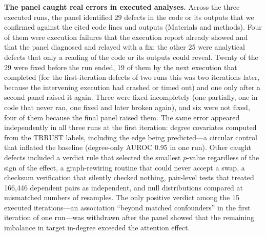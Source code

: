 \textbf{The panel caught real errors in executed analyses.} Across the three executed runs, the panel identified 29 defects in the code or its outputs that we confirmed against the cited code lines and outputs (Materials and methods). Four of them were execution failures that the execution report already showed and that the panel diagnosed and relayed with a fix; the other 25 were analytical defects that only a reading of the code or its outputs could reveal. Twenty of the 29 were fixed before the run ended, 19 of them by the next execution that completed (for the first-iteration defects of two runs this was two iterations later, because the intervening execution had crashed or timed out) and one only after a second panel raised it again. Three were fixed incompletely (one partially, one in code that never ran, one fixed and later broken again), and six were not fixed, four of them because the final panel raised them. The same error appeared independently in all three runs at the first iteration: degree covariates computed from the TRRUST labels, including the edge being predicted---a circular control that inflated the baseline (degree-only AUROC 0.95 in one run). Other caught defects included a verdict rule that selected the smallest $p$-value regardless of the sign of the effect, a graph-rewiring routine that could never accept a swap, a checksum verification that silently checked nothing, pair-level tests that treated 166,446 dependent pairs as independent, and null distributions compared at mismatched numbers of resamples. The only positive verdict among the 15 executed iterations---an association ``beyond matched confounders'' in the first iteration of one run---was withdrawn after the panel showed that the remaining imbalance in target in-degree exceeded the attention effect.

